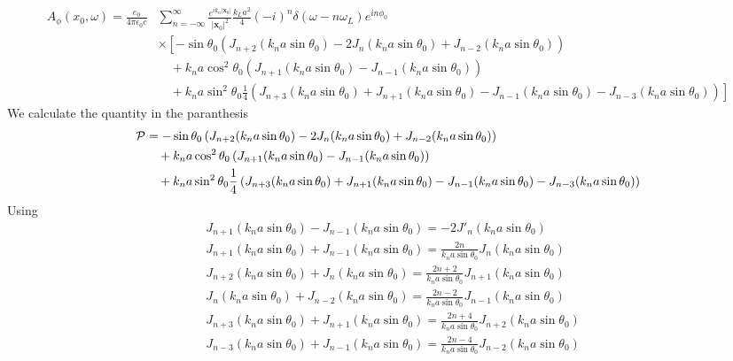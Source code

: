\begin{align}
    A_\phi(x_0,\omega)=\frac{e_0 }{4\pi\epsilon_0 c} & \sum_{n=-\infty}^{\infty}\frac{e^{i k_n|{\bm x}_0|}}{|{\bm x}_0|^2}\frac{k_La^2}4 (-i)^n \delta(\omega-n\omega_L)e^{in\phi_0}\nonumber                              \\
                                                     & \times\left[-\sin\theta_0\left(J_{n+2}(k_na\sin\theta_0)-2J_n(k_na\sin\theta_0)+J_{n-2}(k_na\sin\theta_0)\right)\right. \nonumber                                   \\
                                                     & \quad +{k_na}\cos^2\theta_0\left(J_{n+1}(k_na\sin\theta_0)-J_{n-1}(k_na\sin\theta_0)\right)\nonumber                                                                \\
                                                     & \left. \quad+k_na\sin^2\theta_0\frac1{4}\left(J_{n+3}(k_na\sin\theta_0)+J_{n+1}(k_na\sin\theta_0)-J_{n-1}(k_na\sin\theta_0)-J_{n-3}(k_na\sin\theta_0)\right)\right]
\end{align}
We calculate the quantity in the paranthesis
\begin{align}
    {\cal P} & =-\sin\theta_0\left(J_{n+2}(k_na\sin\theta_0)-2J_n(k_na\sin\theta_0)+J_{n-2}(k_na\sin\theta_0)\right) \nonumber                                       \\
             & \quad +{k_na}\cos^2\theta_0\left(J_{n+1}(k_na\sin\theta_0)-J_{n-1}(k_na\sin\theta_0)\right)\nonumber                                                  \\
             & \quad+k_na\sin^2\theta_0\frac1{4}\left(J_{n+3}(k_na\sin\theta_0)+J_{n+1}(k_na\sin\theta_0)-J_{n-1}(k_na\sin\theta_0)-J_{n-3}(k_na\sin\theta_0)\right)
\end{align}
Using
\begin{align}
     & J_{n+1}(k_na\sin\theta_0)-J_{n-1}(k_na\sin\theta_0)=-2J'_{n}(k_na\sin\theta_0)                             \\
     & J_{n+1}(k_na\sin\theta_0)+J_{n-1}(k_na\sin\theta_0)=\frac{2n}{k_na\sin\theta_0}J_{n}(k_na\sin\theta_0)     \\
     & J_{n+2}(k_na\sin\theta_0)+J_{n}(k_na\sin\theta_0)=\frac{2n+2}{k_na\sin\theta_0}J_{n+1}(k_na\sin\theta_0)   \\
     & J_{n}(k_na\sin\theta_0)+J_{n-2}(k_na\sin\theta_0)=\frac{2n-2}{k_na\sin\theta_0}J_{n-1}(k_na\sin\theta_0)   \\
     & J_{n+3}(k_na\sin\theta_0)+J_{n+1}(k_na\sin\theta_0)=\frac{2n+4}{k_na\sin\theta_0}J_{n+2}(k_na\sin\theta_0) \\
     & J_{n-3}(k_na\sin\theta_0)+J_{n-1}(k_na\sin\theta_0)=\frac{2n-4}{k_na\sin\theta_0}J_{n-2}(k_na\sin\theta_0)
\end{align}

